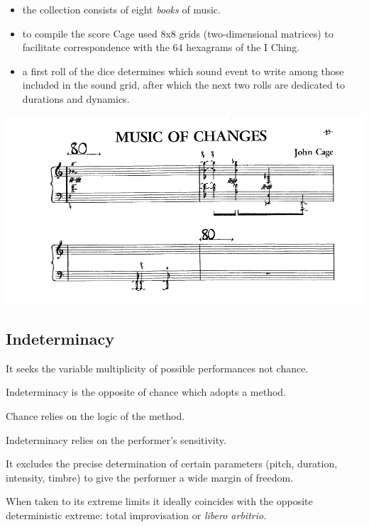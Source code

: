 \begin{itemize}
  \begin{itemize}
  \tightlist
  \item the collection consists of eight \textit{books} of music.
  \item to compile the score Cage used 8x8 grids (two-dimensional matrices) to facilitate correspondence with the 64 hexagrams of the I Ching.
  \item a first roll of the dice determines which sound event to write among those included in the sound grid, after which the next two rolls are dedicated to durations and dynamics.
  \end{itemize}
  
  \begin{center}
  \includegraphics[scale=0.75]{../img/Music_O_C.png}
  \end{center}
\end{itemize}

\subsection{Indeterminacy}\label{indeterminacy}

It seeks the variable multiplicity of possible performances not chance.

Indeterminacy is the opposite of chance which adopts a method.

Chance relies on the logic of the method.

Indeterminacy relies on the performer's sensitivity.

It excludes the precise determination of certain parameters (pitch, duration, intensity, timbre) to give the performer a wide margin of freedom.

When taken to its extreme limits it ideally coincides with the opposite deterministic extreme: total improvisation or \textit{libero arbitrio}.


